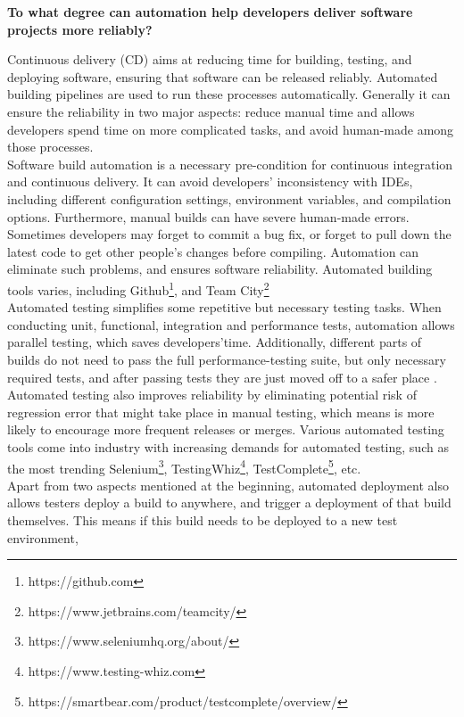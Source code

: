 \documentclass[12pt]{article}
\begin{document}
\pagestyle{empty}

{\bf To what degree can automation help developers 
deliver software projects more reliably?}

Continuous delivery (CD) aims at reducing time for building, 
testing, and deploying software, ensuring that software can be 
released reliably. Automated building pipelines are used to run these
processes automatically. Generally it can ensure the reliability 
in two major aspects: reduce manual time and allows developers 
spend time on more complicated tasks, and avoid human-made among those 
processes. \\[5px]
Software build automation is a necessary pre-condition for continuous integration
and continuous delivery. It can avoid developers' inconsistency with IDEs, 
including different configuration settings, environment variables, 
and compilation options. Furthermore, manual builds can have severe human-made errors. 
Sometimes developers may forget to commit a bug fix, or forget to pull down 
the latest code to get other people's changes before compiling. Automation can
eliminate such problems, and ensures software reliability\cite{AutoBuild}. Automated building 
tools varies, including Github\footnote{https://github.com}, and Team 
City\footnote{https://www.jetbrains.com/teamcity/}\\[5px]
Automated testing simplifies some repetitive but necessary testing tasks. 
When conducting unit, functional, integration and performance tests, 
automation allows parallel testing, which saves developers'time. Additionally, 
different parts of builds do not need to pass the full performance-testing suite, 
but only necessary required tests, and after passing tests they are just moved off 
to a safer place \cite{DeployProd}. 
Automated testing also improves reliability by eliminating potential risk 
of regression error that might take place in manual testing, 
which means is more likely to encourage more frequent releases or merges. 
Various automated testing tools come into industry with increasing demands for 
automated testing, such as the most trending 
Selenium\footnote{https://www.seleniumhq.org/about/}, 
TestingWhiz\footnote{https://www.testing-whiz.com}, 
TestComplete\footnote{https://smartbear.com/product/testcomplete/overview/}, etc.\\[5px]
Apart from two aspects mentioned at the beginning, automated deployment also allows
testers deploy a build to anywhere, and trigger a deployment of that build themselves\cite{DeployProd}.
This means if this build needs to be deployed to a new test environment, 
\end{document}
